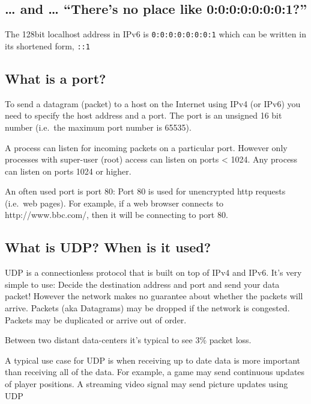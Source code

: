 \subsection{\texorpdfstring{\ldots{} and \ldots{} ``There's no place
like
0:0:0:0:0:0:0:1?''}{\ldots{} and \ldots{} There's no place like 0:0:0:0:0:0:0:1?}}\label{and-theres-no-place-like-00000001}

The 128bit localhost address in IPv6 is \texttt{0:0:0:0:0:0:0:1} which
can be written in its shortened form, \texttt{::1}

\subsection{What is a port?}\label{what-is-a-port}

To send a datagram (packet) to a host on the Internet using IPv4 (or
IPv6) you need to specify the host address and a port. The port is an
unsigned 16 bit number (i.e.~the maximum port number is 65535).

A process can listen for incoming packets on a particular port. However
only processes with super-user (root) access can listen on ports
\textless{} 1024. Any process can listen on ports 1024 or higher.

An often used port is port 80: Port 80 is used for unencrypted http
requests (i.e.~web pages). For example, if a web browser connects to
http://www.bbc.com/, then it will be connecting to port 80.

\subsection{What is UDP? When is it
used?}\label{what-is-udp-when-is-it-used}

UDP is a connectionless protocol that is built on top of IPv4 and IPv6.
It's very simple to use: Decide the destination address and port and
send your data packet! However the network makes no guarantee about
whether the packets will arrive. Packets (aka Datagrams) may be dropped
if the network is congested. Packets may be duplicated or arrive out of
order.

Between two distant data-centers it's typical to see 3\% packet loss.

A typical use case for UDP is when receiving up to date data is more
important than receiving all of the data. For example, a game may send
continuous updates of player positions. A streaming video signal may
send picture updates using UDP

